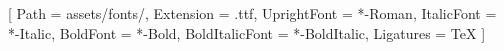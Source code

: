\usepackage{fontspec}
\setmainfont{Brill}[
  Path           = assets/fonts/,
  Extension      = .ttf,
  UprightFont    = *-Roman,
  ItalicFont     = *-Italic,
  BoldFont       = *-Bold,
  BoldItalicFont = *-BoldItalic,
  Ligatures      = TeX
]
\let\ttfamily\rmfamily

\usepackage{microtype}
\setlength{\parskip}{0.45em plus 0.1em minus 0.05em}
\setlength{\parindent}{0pt}
\usepackage{booktabs}
